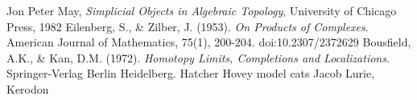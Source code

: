 \documentclass{amsart}
\theoremstyle{definition}
\begin{document}
\begin{thebibliography}{10}
 Jon Peter May, {\it Simplicial Objects in Algebraic Topology}, University of Chicago Press, 1982
 Eilenberg, S., \& Zilber, J. (1953). {\it On Products of Complexes}. American Journal of Mathematics, 75(1), 200-204. doi:10.2307/2372629
 Bousfield, A.K., \& Kan, D.M. (1972). {\it Homotopy Limits, Completions and Localizations}. Springer-Verlag Berlin Heidelberg.
 Hatcher
 Hovey model cats
 Jacob Lurie, Kerodon
\end{thebibliography} 




\end{document}
